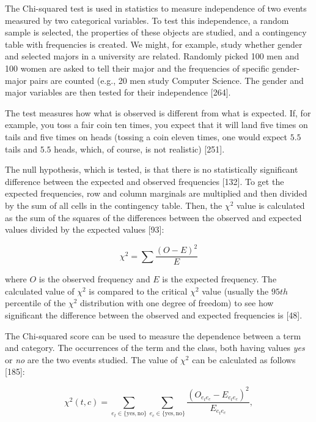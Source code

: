 \documentclass[11pt,openany,executivepaper]{book}
\begin{document}
The Chi-squared test is used in statistics to measure independence of two events measured by two categorical variables. To test this independence, a random sample is selected, the properties of these objects are studied, and a contingency table with frequencies is created. We might, for example, study whether gender and selected majors in a university are related. Randomly picked 100 men and 100 women are asked to tell their major and the frequencies of specific gender-major pairs are counted (e.g., 20 men study Computer Science. The gender and major variables are then tested for their independence [264].

The test measures how what is observed is different from what is expected. If, for example, you toss a fair coin ten times, you expect that it will land five times on tails and five times on heads (tossing a coin eleven times, one would expect $5.5$ tails and $5.5$ heads, which, of course, is not realistic) [251].

The null hypothesis, which is tested, is that there is no statistically significant difference between the expected and observed frequencies [132]. To get the expected frequencies, row and column marginals are multiplied and then divided by the sum of all cells in the contingency table. Then, the $\chi^2$ value is calculated as the sum of the squares of the differences between the observed and expected values divided by the expected values [93]:

\begin{equation}
    \chi^2 = \sum \frac{(O - E)^2}{E}
\end{equation}

where $O$ is the observed frequency and $E$ is the expected frequency. The calculated value of $\chi^2$ is compared to the critical $\chi^2$ value (usually the $95th$ percentile of the $\chi^2$ distribution with one degree of freedom) to see how significant the difference between the observed and expected frequencies is [48].

The Chi-squared score can be used to measure the dependence between a term and category. The occurrences of the term and the class, both having values \textit{yes} or \textit{no} are the two events studied. The value of $\chi^2$ can be calculated as follows [185]:

\begin{equation}
    \chi^2(t,c) = \sum_{e_t \in \{\text{yes}, \text{no}\}} \sum_{e_c \in \{\text{yes}, \text{no}\}} \frac{(O_{e_t e_c} - E_{e_t e_c})^2}{E_{e_t e_c}},
\end{equation}
\end{document}
